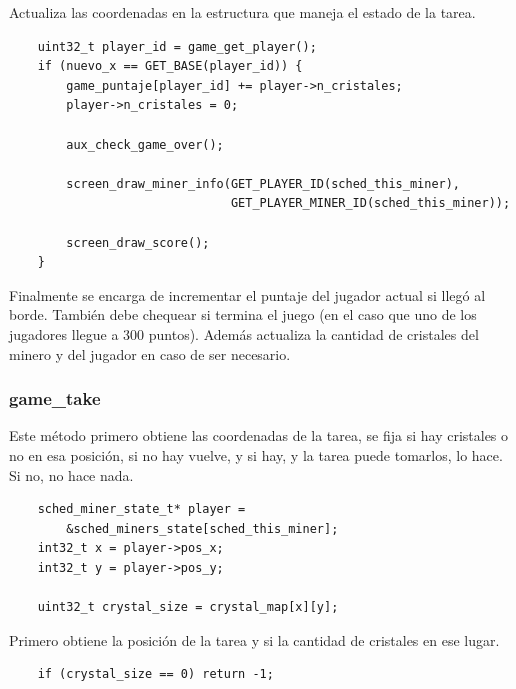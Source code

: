 \documentclass[a4paper]{article}
\newenvironment{codesnippet}{%
	\begin{Sbox}\begin{minipage}{\textwidth}\sffamily\small}%
	{\end{minipage}\end{Sbox}%
		\begin{center}%
		\vspace{-0.4cm}\colorbox{litegrey}{\TheSbox}\end{center}\vspace{0.3cm}}
\begin{document}
Actualiza las coordenadas en la estructura que maneja el estado de la tarea.

\begin{codesnippet}
  \begin{verbatim}
    uint32_t player_id = game_get_player();
    if (nuevo_x == GET_BASE(player_id)) {
        game_puntaje[player_id] += player->n_cristales;
        player->n_cristales = 0;

        aux_check_game_over();

        screen_draw_miner_info(GET_PLAYER_ID(sched_this_miner),
                               GET_PLAYER_MINER_ID(sched_this_miner));

        screen_draw_score();
    }
     \end{verbatim}
\end{codesnippet}

Finalmente se encarga de incrementar el puntaje del jugador actual si llegó al borde. También debe chequear si termina
el juego (en el caso que uno de los jugadores llegue a 300 puntos).                   Además actualiza la cantidad de
cristales del minero y del jugador en caso de ser necesario.

\subsubsection{game_take}

Este método primero obtiene las coordenadas de la tarea, se fija si hay cristales o no en esa posición, si no hay
vuelve, y si hay, y la tarea puede tomarlos, lo hace. Si no, no hace nada.

\begin{codesnippet}
  \begin{verbatim}
    sched_miner_state_t* player =
        &sched_miners_state[sched_this_miner];
    int32_t x = player->pos_x;
    int32_t y = player->pos_y;

    uint32_t crystal_size = crystal_map[x][y];
     \end{verbatim}
\end{codesnippet}

Primero obtiene la posición de la tarea y si la cantidad de cristales en ese lugar.

\begin{codesnippet}
  \begin{verbatim}
    if (crystal_size == 0) return -1;
     \end{verbatim}
\end{codesnippet}
\end{document}
